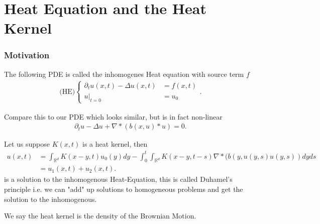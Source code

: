 \section{Heat Equation and the Heat Kernel}
\subsubsection{Motivation}
\begin{definition}\label{HE}
 The following PDE is called the inhomogenes Heat equation with source term $f$ 
 \begin{align*}
   \text{(HE)}\begin{cases}
   \partial_t u(x,t) - \Delta u(x,t) &=f(x,t)\\
   u \rvert_{t=0} &= u_0
 \end{cases} 
 .\end{align*}
\end{definition}
\begin{remark}
 Compare this to our PDE which looks similar, but is in fact non-linear 
\begin{align*}
 \partial_t u - \Delta u + \nabla * (b(x,u)*u) = 0
 .\end{align*}
\end{remark}
\begin{remark}
 Let us suppose $K(x,t)$  is a heat kernel, then 
  \begin{align*}
    u(x,t) &=  \int_{\mathbb{R}^{d} } K(x-y,t) u_0(y) dy - \int_0^{t} \int_{\mathbb{R}^{d} }  K(x-y,t-s) \nabla * (b(y,u(y,s)u(y,s))dy ds \\
           &= u_{1}(x,t) + u_{2}(x,t)
  .\end{align*}
  is a solution to the inhomogenous Heat-Equation, this is called Duhamel's principle i.e. we can "add" up solutions
  to homogeneous problems and get the solution to the inhomogenous.
\end{remark}
\begin{remark}
 We say the heat kernel is the density of the Brownian Motion. 
\end{remark}
